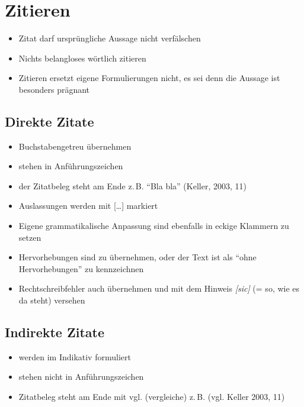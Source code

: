 \section{Zitieren}
\begin{itemize}\itemsep0em
	\item Zitat darf ursprüngliche Aussage nicht verfälschen
	\item Nichts belangloses wörtlich zitieren
	\item Zitieren ersetzt eigene Formulierungen nicht, es sei denn die Aussage ist besonders prägnant
\end{itemize}

\subsection{Direkte Zitate}
\begin{itemize}\itemsep0em
	\item Buchstabengetreu übernehmen
	\item stehen in Anführungszeichen
	\item der Zitatbeleg steht am Ende z.\,B. \enquote{Bla bla} (Keller, 2003, 11)
	\item Auslassungen werden mit [\dots] markiert
	\item Eigene grammatikalische Anpassung sind ebenfalls in eckige Klammern zu setzen
	\item Hervorhebungen sind zu übernehmen, oder der Text ist als \enquote{ohne Hervorhebungen} zu kennzeichnen
	\item Rechtschreibfehler auch übernehmen und mit dem Hinweis \textit{[sic]} (= so, wie es da steht) versehen
\end{itemize}
 
\subsection{Indirekte Zitate}
\begin{itemize}\itemsep0em
	\item werden im Indikativ formuliert
	\item stehen nicht in Anführungszeichen
	\item Zitatbeleg steht am Ende mit vgl. (vergleiche) z.\,B. (vgl. Keller 2003, 11)
\end{itemize}
